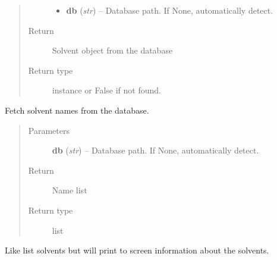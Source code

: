\documentclass[letterpaper,10pt,english]{sphinxmanual}
\begin{document}
\begin{fulllineitems}
\begin{fulllineitems}
\begin{quote}
\begin{description}
\begin{itemize}
\item {} 
\textbf{db} (\emph{str}) -- Database path. If None, automatically detect.

\end{itemize}

\item[{Return}] \leavevmode
Solvent object from the database

\item[{Return type}] \leavevmode
{\hyperref[solvents:pyMDMix.Solvents.Solvent]{}} instance or False if not found.

\end{description}\end{quote}

\end{fulllineitems}


\begin{fulllineitems}
\label{solvents:pyMDMix.Solvents.SolventManager.listSolvents}
Fetch solvent names from the database.
\begin{quote}\begin{description}
\item[{Parameters}] \leavevmode
\textbf{db} (\emph{str}) -- Database path. If None, automatically detect.

\item[{Return}] \leavevmode
Name list

\item[{Return type}] \leavevmode
list

\end{description}\end{quote}

\end{fulllineitems}


\begin{fulllineitems}
\label{solvents:pyMDMix.Solvents.SolventManager.printSolvents}
Like list solvents but will print to screen information about the solvents.

\end{fulllineitems}



\end{fulllineitems}
\end{document}
